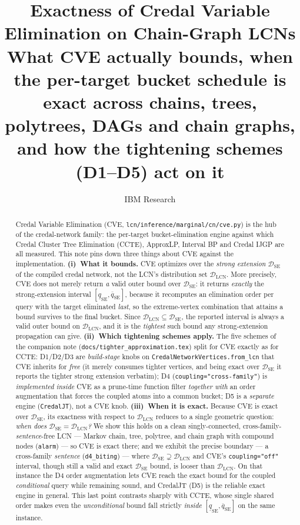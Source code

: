 \documentclass[11pt]{article}
\title{Exactness of Credal Variable Elimination on Chain-Graph LCNs\\
\large What CVE actually bounds, when the per-target bucket schedule is exact
across chains, trees, polytrees, DAGs and chain graphs, and how the tightening
schemes (D1--D5) act on it}
\author{IBM Research}
\date{}
\newcommand{\lo}{\underline}
\newcommand{\hi}{\overline}
\newcommand{\DSE}{\mathcal{D}_{\mathrm{SE}}}
\newcommand{\DLCN}{\mathcal{D}_{\mathrm{LCN}}}
\begin{document}
\maketitle

\begin{abstract}
Credal Variable Elimination (CVE, \texttt{lcn/inference/marginal/cn/cve.py}) is the hub of the
credal-network family: the per-target bucket-elimination engine against which Credal Cluster Tree
Elimination (CCTE), ApproxLP, Interval BP and Credal IJGP are all measured. This note pins down
three things about CVE against the implementation. \textbf{(i)~What it bounds.} CVE optimizes over
the \emph{strong extension} $\DSE$ of the compiled credal network, not the LCN's distribution set
$\DLCN$. More precisely, CVE does not merely return \emph{a} valid outer bound over $\DSE$: it
returns \emph{exactly} the strong-extension interval $[\lo q_{\mathrm{SE}},\hi q_{\mathrm{SE}}]$,
because it recomputes an elimination order per query with the target eliminated \emph{last}, so the
extreme-vertex combination that attains a bound survives to the final bucket. Since
$\DLCN\subseteq\DSE$, the reported interval is always a valid outer bound on $\DLCN$, and it is the
\emph{tightest} such bound any strong-extension propagation can give.
\textbf{(ii)~Which tightening schemes apply.} The five schemes of the companion note
(\texttt{docs/tighter\_approximation.tex}) split for CVE exactly as for CCTE: D1/D2/D3 are
\emph{build-stage} knobs on \texttt{CredalNetworkVertices.from\_lcn} that CVE inherits for
\emph{free} (it merely consumes tighter vertices, and being exact over $\DSE$ it reports the
tighter strong extension verbatim); D4 (\texttt{coupling="cross-family"}) is \emph{implemented
inside} CVE as a prune-time function filter \emph{together with} an order augmentation that forces
the coupled atoms into a common bucket; D5 is a \emph{separate} engine (\texttt{CredalJT}), not a
CVE knob. \textbf{(iii)~When it is exact.} Because CVE is exact over $\DSE$, its exactness with
respect to $\DLCN$ reduces to a single geometric question: \emph{when does $\DSE=\DLCN$?} We show
this holds on a clean singly-connected, cross-family-\emph{sentence}-free LCN --- Markov chain,
tree, polytree, and chain graph with compound nodes (\texttt{alarm}) --- so CVE is exact there; and
we exhibit the precise boundary --- a cross-family \emph{sentence} (\texttt{d4\_biting}) --- where
$\DSE\supsetneq\DLCN$ and CVE's \texttt{coupling="off"} interval, though still a valid and exact
$\DSE$ bound, is looser than $\DLCN$. On that instance the D4 order augmentation lets CVE reach the
exact bound for the coupled \emph{conditional} query while remaining sound, and CredalJT (D5) is the
reliable exact engine in general. This last point contrasts sharply with CCTE, whose single shared
order makes even the \emph{unconditional} bound fall strictly \emph{inside} $[\lo q_{\mathrm{SE}},\hi
q_{\mathrm{SE}}]$ on the same instance.
\end{abstract}
\end{document}
